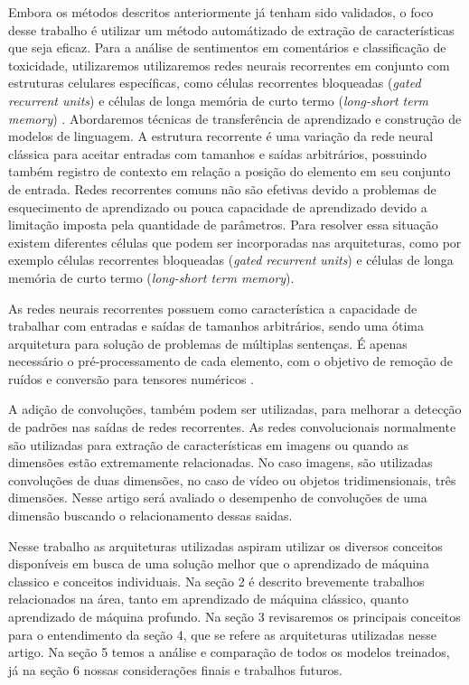 \documentclass[12pt]{article}
\begin{document}
Embora os métodos descritos anteriormente já tenham sido validados, o foco desse trabalho é utilizar um método automátizado de extração de características que seja eficaz. Para a análise de sentimentos em comentários e classificação de toxicidade, utilizaremos utilizaremos redes neurais recorrentes em conjunto com estruturas celulares específicas, como células recorrentes bloqueadas (\textit{gated recurrent units}) \cite{DBLP:journals/corr/PascanuGCB13} e células de longa memória de curto termo (\textit{long-short term memory}) \cite{sep:97}. Abordaremos técnicas de transferência de aprendizado e construção de modelos de linguagem.
A estrutura recorrente é uma variação da rede neural clássica para aceitar entradas com tamanhos e saídas arbitrários, possuindo também registro de contexto em relação a posição do elemento em seu conjunto de entrada. Redes recorrentes comuns não são efetivas devido a problemas de esquecimento de aprendizado ou pouca capacidade de aprendizado devido a limitação imposta pela quantidade de parâmetros. Para resolver essa situação existem diferentes células que podem ser incorporadas nas arquiteturas, como por exemplo células recorrentes bloqueadas (\textit{gated recurrent units}) e células de longa memória de curto termo (\textit{long-short term memory}).

As redes neurais recorrentes possuem como característica a capacidade de trabalhar com entradas e saídas de tamanhos arbitrários, sendo uma ótima arquitetura para solução de problemas de múltiplas sentenças. É apenas necessário o pré-processamento de cada elemento, com o objetivo de remoção de ruídos e conversão para tensores numéricos \cite{karpathy:2015}.

A adição de convoluções, também podem ser utilizadas, para melhorar a detecção de padrões nas saídas de redes recorrentes. As redes convolucionais normalmente são utilizadas para extração de características em imagens \cite{lecun:98} ou quando as dimensões estão extremamente relacionadas. No caso imagens, são utilizadas convoluções de duas dimensões, no caso de vídeo ou objetos tridimensionais, três dimensões. Nesse artigo será avaliado o desempenho de convoluções de uma dimensão buscando o relacionamento dessas saidas.

Nesse trabalho as arquiteturas utilizadas aspiram utilizar os diversos conceitos disponíveis em busca de uma solução melhor que o aprendizado de máquina classico e conceitos individuais. Na seção 2 é descrito brevemente trabalhos relacionados na área, tanto em aprendizado de máquina clássico, quanto aprendizado de máquina profundo. Na seção 3 revisaremos os principais conceitos para o entendimento da seção 4, que se refere as arquiteturas utilizadas nesse artigo. Na seção 5 temos a análise e comparação de todos os modelos treinados, já na seção 6 nossas considerações finais e trabalhos futuros.
\end{document}
